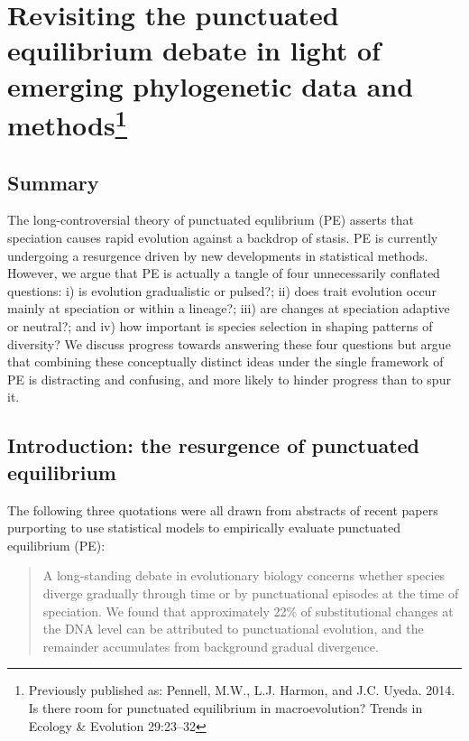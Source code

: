 \chapter[Revisiting the punctuated equilibrium debate in light of emerging phylogenetic data and methods]{Revisiting the punctuated equilibrium debate in light of emerging phylogenetic data and methods\footnote{Previously published as: Pennell, M.W., L.J. Harmon, and J.C. Uyeda. 2014.
  Is there room for punctuated equilibrium in macroevolution?
  Trends in Ecology \& Evolution 29:23--32}}
\label{chap:punceq}

\section{Summary}

The long-controversial theory of punctuated equlibrium (PE) asserts that speciation causes rapid evolution against a backdrop of stasis. PE is currently undergoing a resurgence driven by new developments in statistical methods. However, we argue that PE is actually a tangle of four unnecessarily conflated questions: i) is evolution gradualistic or pulsed?; ii) does trait evolution occur mainly at speciation or within a lineage?; iii) are changes at speciation adaptive or neutral?; and iv) how important is species selection in shaping patterns of diversity? We discuss progress towards answering these four questions but argue that combining these conceptually distinct ideas under the single framework of PE is distracting and confusing, and more likely to hinder progress than to spur it.


\section{Introduction: the resurgence of punctuated equilibrium}

The following three quotations were all drawn from abstracts of recent papers purporting to use statistical models to empirically evaluate punctuated equilibrium (PE):

\begin{quote}
\singlespacing
A long-standing debate in evolutionary biology concerns whether species diverge gradually through time or by punctuational episodes at the time of speciation. We found that approximately 22\% of substitutional changes at the DNA level can be attributed to punctuational evolution, and the remainder accumulates from background gradual divergence. \citep[][p. 119]{Pagel2006}
\end{quote}

